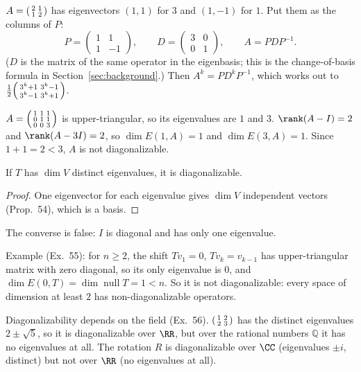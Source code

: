 \documentclass[10pt]{scrartcl}
\DeclareMathOperator{\nul}{null}
\begin{document}
\begin{example*}
  $A=\begin{psmallmatrix}2&1\\1&2\end{psmallmatrix}$ has eigenvectors $(1,1)$ for $3$ and $(1,-1)$ for $1$. Put them as the columns of $P$:
  \[ P=\begin{pmatrix}1&1\\1&-1\end{pmatrix},\qquad D=\begin{pmatrix}3&0\\0&1\end{pmatrix},\qquad A=PDP^{-1}. \]
  ($D$ is the matrix of the same operator in the eigenbasis; this is the change-of-basis formula in Section~\ref{sec:background}.) Then $A^k=PD^kP^{-1}$, which works out to $\tfrac12\begin{psmallmatrix}3^k+1&3^k-1\\3^k-1&3^k+1\end{psmallmatrix}$.
\end{example*}

\begin{example*}
  $A=\begin{psmallmatrix}1&1&1\\0&1&1\\0&0&3\end{psmallmatrix}$ is upper-triangular, so its eigenvalues are $1$ and $3$. $\rank(A-I)=2$ and $\rank(A-3I)=2$, so $\dim E(1,A)=1$ and $\dim E(3,A)=1$. Since $1+1=2<3$, $A$ is not diagonalizable.
\end{example*}

\begin{proposition*}
  If $T$ has $\dim V$ distinct eigenvalues, it is diagonalizable.
\end{proposition*}
\begin{proof}
  One eigenvector for each eigenvalue gives $\dim V$ independent vectors (Prop.~54), which is a basis.
\end{proof}
The converse is false: $I$ is diagonal and has only one eigenvalue.

Example (Ex.~55): for $n\ge2$, the shift $Tv_1=0$, $Tv_k=v_{k-1}$ has upper-triangular matrix with zero diagonal, so its only eigenvalue is $0$, and $\dim E(0,T)=\dim\nul T=1<n$. So it is not diagonalizable: every space of dimension at least $2$ has non-diagonalizable operators.

Diagonalizability depends on the field (Ex.~56). $\begin{psmallmatrix}1&2\\2&3\end{psmallmatrix}$ has the distinct eigenvalues $2\pm\sqrt5$, so it is diagonalizable over $\RR$, but over the rational numbers $\mathbb Q$ it has no eigenvalues at all. The rotation $R$ is diagonalizable over $\CC$ (eigenvalues $\pm i$, distinct) but not over $\RR$ (no eigenvalues at all).
\end{document}
